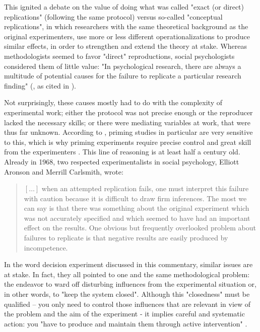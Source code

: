 \documentclass[twocolumn, serif, authordate, reflection]{jote-article}
\begin{document}
This ignited a debate on the value of doing what was called "exact (or direct) replications" (following the same protocol) versus so-called "conceptual replications", in which researchers with the same theoretical background as the original experimenters, use more or less different operationalizations to produce similar effects, in order to strengthen and extend the theory at stake. Whereas methodologists seemed to favor "direct" reproductions, social psychologists considered them of little value: "In psychological research, there are always a multitude of potential causes for the failure to replicate a particular research finding"  (\cite{Stroebe2012}, as cited in \cite[p. 183]{Derksen2017}). 

Not surprisingly, these causes mostly had to do with the complexity of experimental work; either the protocol was not precise enough or the reproducer lacked the necessary skills; or there were mediating variables at work, that were thus far unknown. According to \textcite{Bargh1996}, priming studies in particular are very sensitive to this, which is why priming experiments require precise control and great skill from the experimenters \parencite{Derksen2017}. This line of reasoning is at least half a century old. Already in 1968, two respected experimentalists in social psychology, Elliott Aronson and Merrill Carlsmith, wrote: 

\blockquote{$[\dots]$ when an attempted replication fails, one must interpret this failure with caution because it is difficult to draw firm inferences. The most we can say is that there was something about the original experiment which was not accurately specified and which seemed to have had an important effect on the results. One obvious but frequently overlooked problem about failures to replicate is that negative results are easily produced by incompetence. \parencite[p. 21]{Aronson1968}}

In the word decision experiment discussed in this commentary, similar issues are at stake. In fact, they all pointed to one and the same methodological problem: the endeavor to ward off disturbing influences from the experimental situation or, in other words, to "keep the system closed". Although this "closedness" must be qualified – you only need to control those influences that are relevant in view of the problem and the aim of the experiment - it implies careful and systematic action: you "have to produce and maintain them through active intervention"  \parencite[p. 122]{Radder1996}. 
 
\end{document}
